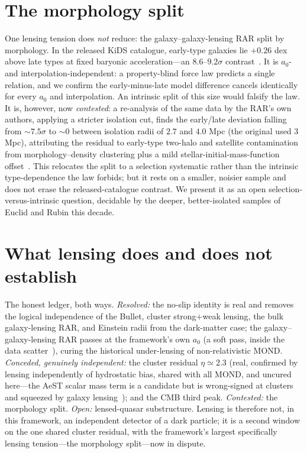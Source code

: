\documentclass[aps,prd,twocolumn,10pt,nofootinbib,superscriptaddress]{revtex4-2}
\begin{document}
\section{The morphology split}
One lensing tension does \emph{not} reduce: the galaxy--galaxy-lensing RAR split by morphology. In the released KiDS
catalogue, early-type galaxies lie $+0.26$ dex above late types at fixed baryonic acceleration---an $8.6$--$9.2\sigma$
contrast~\cite{Brouwer2021}. It is $a_0$- and interpolation-independent: a property-blind force law predicts a single
relation, and we confirm the early-minus-late model difference cancels identically for every $a_0$ and interpolation.
An intrinsic split of this size would falsify the law. It is, however, now \emph{contested}: a re-analysis of the same
data by the RAR's own authors, applying a stricter isolation cut, finds the early/late deviation falling from
$\sim7.5\sigma$ to $\sim0$ between isolation radii of $2.7$ and $4.0$ Mpc (the original used $3$ Mpc), attributing the
residual to early-type two-halo and satellite contamination from morphology--density clustering plus a mild
stellar-initial-mass-function offset~\cite{Mistele2024}. This relocates the split to a selection systematic rather
than the intrinsic type-dependence the law forbids; but it rests on a smaller, noisier sample and does not erase the
released-catalogue contrast. We present it as an open selection-versus-intrinsic question, decidable by the deeper,
better-isolated samples of Euclid and Rubin this decade.

\section{What lensing does and does not establish}
The honest ledger, both ways. \emph{Resolved:} the no-slip identity is real and removes the logical independence of
the Bullet, cluster strong$+$weak lensing, the bulk galaxy-lensing RAR, and Einstein radii from the dark-matter case;
the galaxy--galaxy-lensing RAR passes at the framework's own $a_0$ (a soft pass, inside the data
scatter~\cite{Brouwer2021}), curing the historical under-lensing of non-relativistic MOND. \emph{Conceded, genuinely
independent:} the cluster residual $\eta\!\simeq\!2.3$ (real, confirmed by lensing independently of hydrostatic bias,
shared with all MOND, and uncured here---the AeST scalar mass term is a candidate but is wrong-signed at clusters and
squeezed by galaxy lensing~\cite{Durakovic2024,Mistele2023}); and the CMB third peak. \emph{Contested:} the morphology
split. \emph{Open:} lensed-quasar substructure. Lensing is therefore not, in this framework, an independent detector
of a dark particle; it is a second window on the one shared cluster residual, with the framework's largest specifically
lensing tension---the morphology split---now in dispute.
\end{document}
